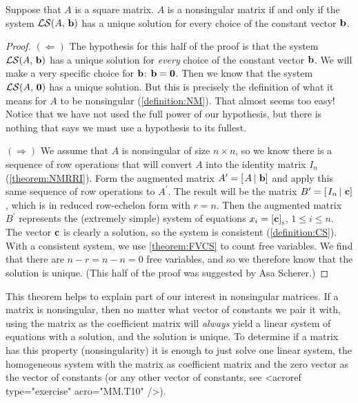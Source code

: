 \documentclass{ximera}
\begin{document}
\begin{theorem}
  \label{theorem:NMUS}
  Suppose that $A$ is a square matrix.  $A$ is a nonsingular matrix if
  and only if the system $\mathcal{LS}\!\left(A,\,\mathbf{b}\right)$ has a unique
  solution for every choice of the constant vector $\mathbf{b}$.

  \begin{proof}
    $(\Leftarrow)$ The hypothesis for this half of the proof is that
    the system $\mathcal{LS}\!\left(A,\,\mathbf{b}\right)$ has a unique solution for
    \textit{every} choice of the constant vector $\mathbf{b}$.  We will
    make a very specific choice for $\mathbf{b}$:
    $\mathbf{b}=\mathbf{0}$.  Then we know that the system
    $\mathcal{LS}\!\left(A,\,\mathbf{0}\right)$ has a unique solution.  But this
    is precisely the definition of what it means for $A$ to be
    nonsingular (\ref{definition:NM}).  That almost seems too easy!
    Notice that we have not used the full power of our hypothesis, but
    there is nothing that says we must use a hypothesis to its
    fullest.

    $(\Rightarrow)$ We assume that $A$ is nonsingular of size
    $n\times n$, so we know there is a sequence of row operations that
    will convert $A$ into the identity matrix $I_n$
    (\ref{theorem:NMRRI}).  Form the augmented matrix
    $A^\prime=\left\lbrack\left.A\,\right\rvert\,\mathbf{b}\right\rbrack$ and apply this same sequence of
    row operations to $A^\prime$.  The result will be the matrix
    $B^\prime=\left\lbrack\left.I_n\,\right\rvert\,\mathbf{c}\right\rbrack$, which is in reduced
    row-echelon form with $r=n$.  Then the augmented matrix $B^\prime$
    represents the (extremely simple) system of equations
    $x_i=\left\lbrack\mathbf{c}\right\rbrack_{i}$, $1\leq i\leq n$.  The vector
    $\mathbf{c}$ is clearly a solution, so the system is consistent
    (\ref{definition:CS}).  With a consistent system, we use
    \ref{theorem:FVCS} to count free variables.  We find that there
    are $n-r=n-n=0$ free variables, and so we therefore know that the
    solution is unique.  (This half of the proof was suggested by Asa
    Scherer.)
\end{proof}
\end{theorem}

This theorem helps to explain part of our interest in nonsingular
matrices.  If a matrix is nonsingular, then no matter what vector of
constants we pair it with, using the matrix as the coefficient matrix
will \textit{always} yield a linear system of equations with a
solution, and the solution is unique.  To determine if a matrix has
this property (nonsingularity) it is enough to just solve one linear
system, the homogeneous system with the matrix as coefficient matrix
and the zero vector as the vector of constants (or any other vector of
constants, see <acroref type="exercise" acro="MM.T10" />).
\end{document}
